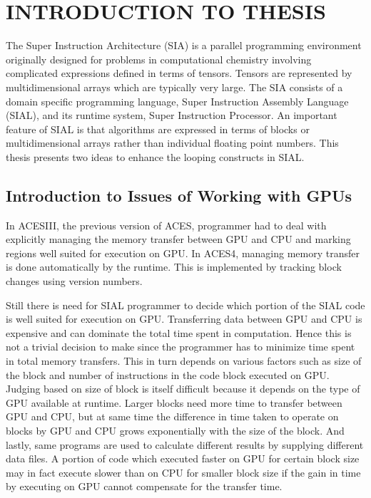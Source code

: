 \chapter{INTRODUCTION TO THESIS}\label{intro}
The Super Instruction Architecture (SIA) is a parallel programming environment
originally designed for problems in computational chemistry involving complicated
expressions defined in terms of tensors. Tensors are represented by
multidimensional arrays which are typically very large. The SIA consists of a
domain specific programming language, Super Instruction Assembly Language
(SIAL), and its runtime system, Super Instruction Processor. An important
feature of SIAL is that algorithms are expressed in terms of blocks or
multidimensional arrays rather than individual floating point numbers. This thesis
presents two ideas to enhance the looping constructs in SIAL.

\section{Introduction to Issues of Working with GPUs}
In ACESIII, the previous version of ACES, programmer had to deal with explicitly managing
the memory transfer between GPU and CPU and marking regions well suited for execution
on GPU. In ACES4, managing memory transfer is done automatically by the runtime.
This is implemented by tracking block changes using version numbers.

Still there is need for SIAL programmer to decide which portion of the SIAL code
is well suited for execution on GPU. Transferring data between GPU and CPU is
expensive and can dominate the total time spent in computation. Hence this is not
a trivial decision to make since the programmer has to minimize time spent in
total memory transfers. This in turn depends on various factors such as
size of the block and number of instructions in the code block executed on GPU. Judging
based on size of block is itself difficult because it depends on the type of GPU available
at runtime. Larger blocks need more time to transfer between GPU and CPU, but at
same time the difference in time taken to operate on blocks by GPU and CPU grows
exponentially with the size of the block. And lastly, same programs are used to
calculate different results by supplying different data files. A portion of code
which executed faster on GPU for certain block size may in fact execute slower
than on CPU for smaller block size if the gain in time by executing on GPU cannot
compensate for the transfer time.

